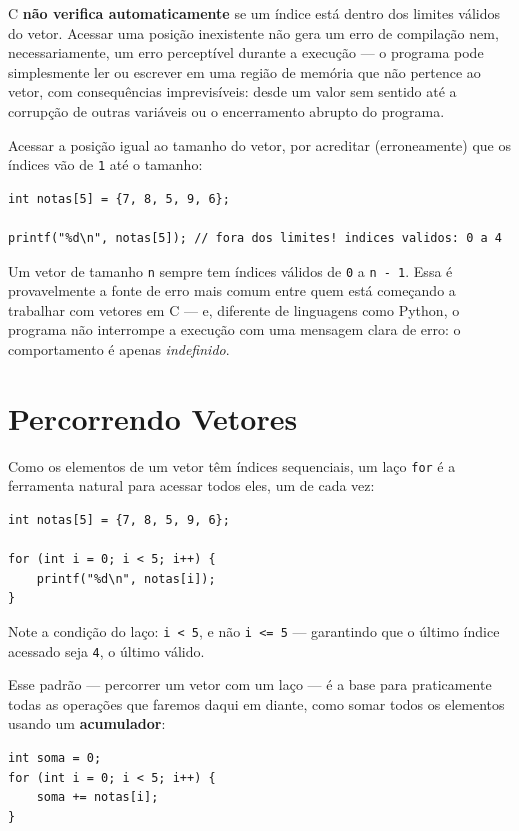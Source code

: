 C \textbf{não verifica automaticamente} se um índice está dentro dos limites válidos do vetor. Acessar uma posição inexistente não gera um erro de compilação nem, necessariamente, um erro perceptível durante a execução — o programa pode simplesmente ler ou escrever em uma região de memória que não pertence ao vetor, com consequências imprevisíveis: desde um valor sem sentido até a corrupção de outras variáveis ou o encerramento abrupto do programa.

\begin{errocomum}
Acessar a posição igual ao tamanho do vetor, por acreditar (erroneamente) que os índices vão de \texttt{1} até o tamanho:
\begin{lstlisting}
int notas[5] = {7, 8, 5, 9, 6};

printf("%d\n", notas[5]); // fora dos limites! indices validos: 0 a 4
\end{lstlisting}
Um vetor de tamanho \texttt{n} sempre tem índices válidos de \texttt{0} a \texttt{n - 1}. Essa é provavelmente a fonte de erro mais comum entre quem está começando a trabalhar com vetores em C — e, diferente de linguagens como Python, o programa não interrompe a execução com uma mensagem clara de erro: o comportamento é apenas \textit{indefinido}.
\end{errocomum}

\section{Percorrendo Vetores}

Como os elementos de um vetor têm índices sequenciais, um laço \texttt{for} é a ferramenta natural para acessar todos eles, um de cada vez:

\begin{lstlisting}
int notas[5] = {7, 8, 5, 9, 6};

for (int i = 0; i < 5; i++) {
    printf("%d\n", notas[i]);
}
\end{lstlisting}

Note a condição do laço: \texttt{i < 5}, e não \texttt{i <= 5} — garantindo que o último índice acessado seja \texttt{4}, o último válido.

Esse padrão — percorrer um vetor com um laço — é a base para praticamente todas as operações que faremos daqui em diante, como somar todos os elementos usando um \textbf{acumulador}:

\begin{lstlisting}
int soma = 0;
for (int i = 0; i < 5; i++) {
    soma += notas[i];
}
\end{lstlisting}

